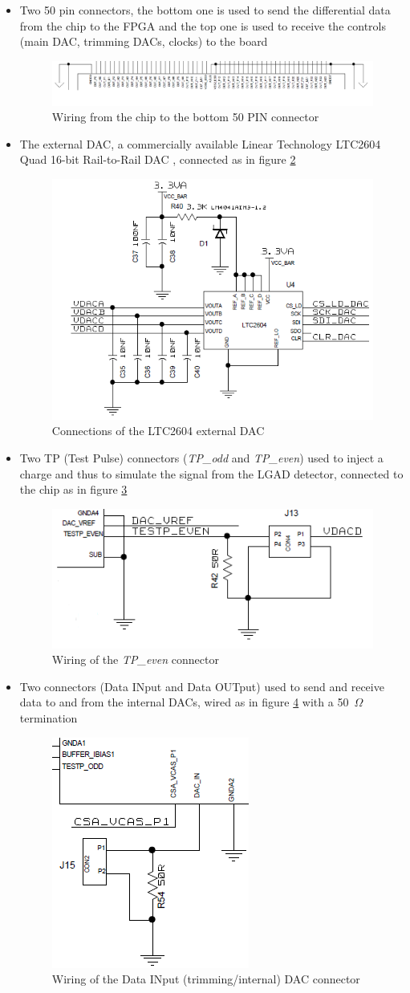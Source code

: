 \begin{itemize}
	\item Two 50 pin connectors, the bottom one is used to send the differential data from the chip to the FPGA and the top one is used to receive the controls (main DAC, trimming DACs, clocks) to the board
	\begin{figure}[H]
		\centering
		\includegraphics[width=0.95\linewidth]{IMG/ch5/DATATOFPGA}
		\caption{Wiring from the chip to the bottom 50 PIN connector}
		\label{fig:datatofpga}
	\end{figure}
	\item The external DAC, a commercially available Linear Technology LTC2604 Quad 16-bit Rail-to-Rail DAC \cite{LTC2604}, connected as in figure \ref{fig:externaldac}
	\begin{figure}[H]
		\centering
		\includegraphics[width=0.3\linewidth]{IMG/ch5/EXTERNALDAC}
		\caption{Connections of the LTC2604 external DAC}
		\label{fig:externaldac}
	\end{figure}
	\item Two TP (Test Pulse) connectors (\textit{TP\_odd} and \textit{TP\_even}) used to inject a charge and thus to simulate the signal from the LGAD detector, connected to the chip as in figure \ref{fig:tpconnector}
	\begin{figure}[H]
		\centering
		\includegraphics[width=0.4\linewidth]{IMG/ch5/TPCONNECTOR}
		\caption{Wiring of the \textit{TP\_even} connector}
		\label{fig:tpconnector}
	\end{figure}
	\item Two connectors (Data INput and Data OUTput) used to send and receive data to and from the internal DACs, wired as in figure \ref{fig:internaldacwiring} with a 50~$\Omega$ termination 
	\begin{figure}[H]
		\centering
		\includegraphics[width=0.2\linewidth]{IMG/ch5/INTERNALDACWIRING}
		\caption{Wiring of the Data INput (trimming/internal) DAC connector}
		\label{fig:internaldacwiring}
	\end{figure} 
\end{itemize} 

